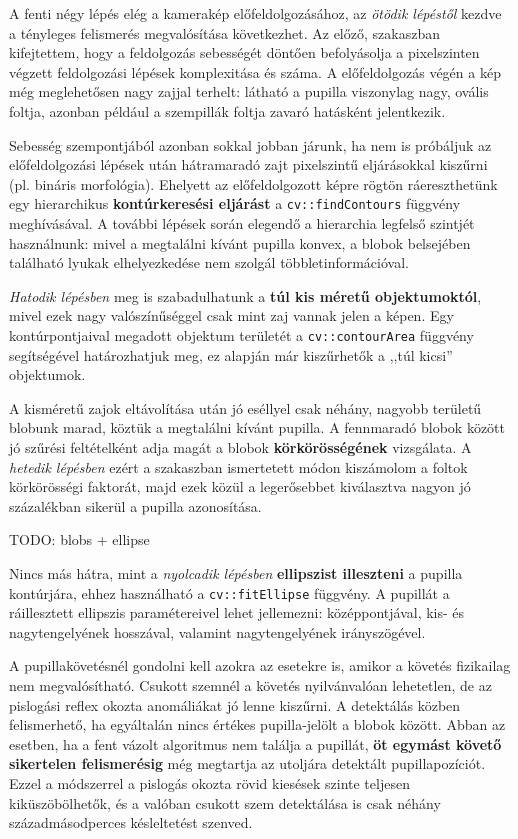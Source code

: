\bigskip

A fenti négy lépés elég a kamerakép előfeldolgozásához, az \emph{ötödik lépéstől} kezdve a tényleges felismerés megvalósítása következhet. Az előző,  szakaszban kifejtettem, hogy a feldolgozás sebességét döntően befolyásolja a pixelszinten végzett feldolgozási lépések komplexitása és száma. A előfeldolgozás végén a kép még meglehetősen nagy zajjal terhelt: látható a pupilla viszonylag nagy, ovális foltja, azonban például a szempillák foltja zavaró hatásként jelentkezik.

Sebesség szempontjából azonban sokkal jobban járunk, ha nem is próbáljuk az előfeldolgozási lépések után hátramaradó zajt pixelszintű eljárásokkal kiszűrni (pl. bináris morfológia). Ehelyett az előfeldolgozott képre rögtön ráereszthetünk egy hierarchikus \textbf{kontúrkeresési eljárást} a \texttt{cv::findContours} függvény meghívásával. A további lépések során elegendő a hierarchia legfelső szintjét használnunk: mivel a megtalálni kívánt pupilla konvex, a blobok belsejében található lyukak elhelyezkedése nem szolgál többletinformációval.

\emph{Hatodik lépésben} meg is szabadulhatunk a \textbf{túl kis méretű objektumoktól}, mivel ezek nagy valószínűséggel csak mint zaj vannak jelen a képen. Egy kontúrpontjaival megadott objektum területét a \texttt{cv::contourArea} függvény segítségével határozhatjuk meg, ez alapján már kiszűrhetők a ,,túl kicsi'' objektumok.

A kisméretű zajok eltávolítása után jó eséllyel csak néhány, nagyobb területű blobunk marad, köztük a megtalálni kívánt pupilla. A fennmaradó blobok között jó szűrési feltételként adja magát a blobok \textbf{körkörösségének} vizsgálata. A \emph{hetedik lépésben} ezért a  szakaszban ismertetett módon kiszámolom a foltok körkörösségi faktorát, majd ezek közül a legerősebbet kiválasztva nagyon jó százalékban sikerül a pupilla azonosítása.

TODO: blobs + ellipse

Nincs más hátra, mint a \emph{nyolcadik lépésben} \textbf{ellipszist illeszteni} a pupilla kontúrjára, ehhez használható a \texttt{cv::fitEllipse} függvény. A pupillát a ráillesztett ellipszis paramétereivel lehet jellemezni: középpontjával, kis- és nagytengelyének hosszával, valamint nagytengelyének irányszögével.

\bigskip

A pupillakövetésnél gondolni kell azokra az esetekre is, amikor a követés fizikailag nem megvalósítható. Csukott szemnél a követés nyilvánvalóan lehetetlen, de az pislogási reflex okozta anomáliákat jó lenne kiszűrni. A detektálás közben felismerhető, ha egyáltalán nincs értékes pupilla-jelölt a blobok között. Abban az esetben, ha a fent vázolt algoritmus nem találja a pupillát, \textbf{öt egymást követő sikertelen felismerésig} még megtartja az utoljára detektált pupillapozíciót. Ezzel a módszerrel a pislogás okozta rövid kiesések szinte teljesen kiküszöbölhetők, és a valóban csukott szem detektálása is csak néhány századmásodperces késleltetést szenved.

